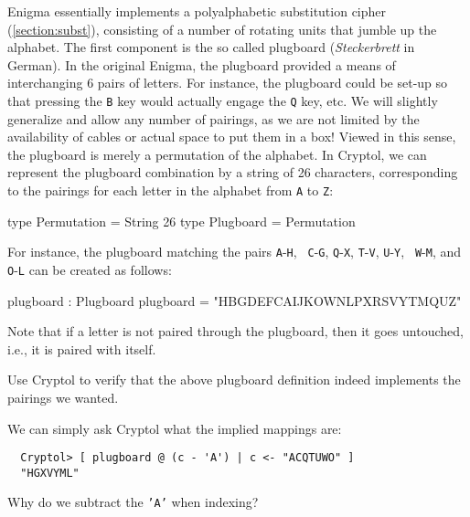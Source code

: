 Enigma essentially implements a polyalphabetic substitution cipher
(\autoref{section:subst})\indPolyAlphSubst, consisting of a number
of rotating units that jumble up the alphabet.  The first component is
the so called plugboard (\textit{Steckerbrett} in
German)\indEnigmaPlugboard. In the original Enigma, the plugboard
provided a means of interchanging 6 pairs of letters. For instance,
the plugboard could be set-up so that pressing the {\tt B} key would
actually engage the {\tt Q} key, etc.  We will slightly generalize and
allow any number of pairings, as we are not limited by the
availability of cables or actual space to put them in a box! Viewed in
this sense, the plugboard is merely a permutation of the alphabet. In
Cryptol, we can represent the plugboard combination by a string of 26
characters, corresponding to the pairings for each letter in the
alphabet from {\tt A} to {\tt Z}:

\begin{code}
  type Permutation = String 26
  type Plugboard = Permutation
\end{code}
For instance, the plugboard matching the pairs {\tt A}-{\tt H}, {\tt
  C}-{\tt G}, {\tt Q}-{\tt X}, {\tt T}-{\tt V}, {\tt U}-{\tt Y}, {\tt
  W}-{\tt M}, and {\tt O}-{\tt L} can be created as follows:
\begin{code}
  plugboard : Plugboard
  plugboard = "HBGDEFCAIJKOWNLPXRSVYTMQUZ"
\end{code}
Note that if a letter is not paired through the plugboard, then it
goes untouched, i.e., it is paired with itself.

\begin{Exercise}\label{ex:enigma:1}
  Use Cryptol to verify that the above plugboard definition indeed
  implements the pairings we wanted.
\end{Exercise}
\begin{Answer}
We can simply ask Cryptol what the implied mappings are:
\begin{Verbatim}
  Cryptol> [ plugboard @ (c - 'A') | c <- "ACQTUWO" ]
  "HGXVYML"
\end{Verbatim}
Why do we subtract the {\tt 'A'} when indexing?
\end{Answer}



